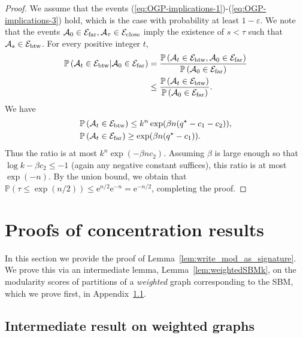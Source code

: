 \documentclass[a4paper,UKenglish,cleveref, autoref, thm-restate,numberwithinsect]{lipics-v2021}
\newcommand{\pr}{{\mathbb P}}
\newcommand{\eps}{\varepsilon}
\begin{document}
\begin{proof}
We assume that the events (\ref{eq:OGP-implications-1})-(\ref{eq:OGP-implications-3}) hold, which is the case with probability at least $1-\eps$.
We note that the events $\mathcal{A}_0\in \mathcal{E}_{\rm far}, \mathcal{A}_\tau\in \mathcal{E}_{\rm close}$
imply the existence of $s<\tau$ such that $\mathcal{A}_s\in \mathcal{E}_{\rm btw}$.  
For every positive integer $t$,
\begin{align*}
\pr\left( \mathcal{A}_t\in \mathcal{E}_{\rm btw} | \mathcal{A}_0\in \mathcal{E}_{\rm far} \right)  &=
{\pr\left( \mathcal{A}_t\in \mathcal{E}_{\rm btw} , \mathcal{A}_0\in \mathcal{E}_{\rm far} \right) 
\over
\pr\left(\mathcal{A}_0\in \mathcal{E}_{\rm far} \right) } \\
&\le 
{\pr\left( \mathcal{A}_t\in \mathcal{E}_{\rm btw}  \right)
\over
\pr\left(\mathcal{A}_0\in \mathcal{E}_{\rm far} \right) }. 
\end{align*}
We have
\begin{align*}
&\pr\left( \mathcal{A}_t\in \mathcal{E}_{\rm btw}\right)\le  k^n \exp(\beta n (q^{\star}-c_1-c_2)), \\
&\pr\left( \mathcal{A}_t\in \mathcal{E}_{\rm far}\right) \ge  \exp(\beta n (q^{\star}-c_1)).
\end{align*}
Thus the ratio is at most $k^n\exp(-\beta n c_2)$. Assuming $\beta$ is large enough so that $\log k-\beta c_2\le -1$ (again any negative
constant suffices), this ratio is at most $\exp(-n)$. By the union bound, we obtain that $\pr(\tau\le \exp(n/2))\le \mathrm{e}^{n/2}\mathrm{e}^{-n}=\mathrm{e}^{-n/2}$,
completing the proof.
\end{proof}





\section{Proofs of concentration results}\label{app:remainder_of_proof}\label{app:concentration}

In this section we provide the proof of Lemma~\ref{lem:write_mod_as_signature}. We prove this via an intermediate lemma, Lemma~\ref{lem:weightedSBMk}, on the modularity scores of partitions of a {\em weighted} graph corresponding to the SBM, which we prove first, in Appendix~\ref{subsec:weightedSBMk}.

\subsection{Intermediate result on weighted graphs}\label{subsec:weightedSBMk}
\end{document}
